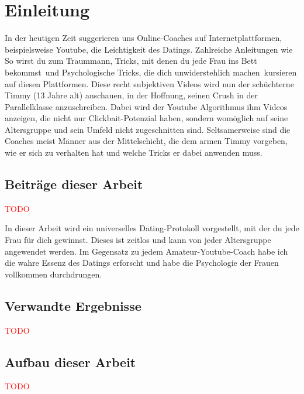 \chapter{Einleitung}
\label{chapter-einleitung}

In der heutigen Zeit suggerieren uns Online-Coaches auf Internetplattformen, beispielsweise Youtube, die Leichtigkeit des Datings.
Zahlreiche Anleitungen wie \glqq So wirst du zum Traummann\grqq, \glqq Tricks, mit denen du jede Frau ins Bett bekommst\grqq~und \glqq Psychologische Tricks, die dich unwiderstehlich machen\grqq~kursieren auf diesen Plattformen.
Diese recht subjektiven Videos wird nun der schüchterne Timmy (13 Jahre alt) anschauen, in der Hoffnung, seinen Crush in der Parallelklasse anzuschreiben.
Dabei wird der Youtube Algorithmus ihm Videos anzeigen, die nicht nur Clickbait-Potenzial haben, sondern womöglich auf seine Altersgruppe und sein Umfeld nicht zugeschnitten sind.
Seltsamerweise sind die Coaches meist Männer aus der Mittelschicht, die dem armen Timmy vorgeben, wie er sich zu verhalten hat und welche Tricks er dabei anwenden muss.



\section{Beiträge dieser Arbeit}
\textcolor{red}{TODO}

In dieser Arbeit wird ein universelles Dating-Protokoll vorgestellt, mit der du jede Frau für dich gewinnst.
Dieses ist zeitlos und kann von jeder Altersgruppe angewendet werden.
Im Gegensatz zu jedem Amateur-Youtube-Coach habe ich die wahre Essenz des Datings erforscht und habe die Psychologie der Frauen vollkommen durchdrungen.



\section{Verwandte Ergebnisse}
\textcolor{red}{TODO}



\section{Aufbau dieser Arbeit}
\textcolor{red}{TODO}

